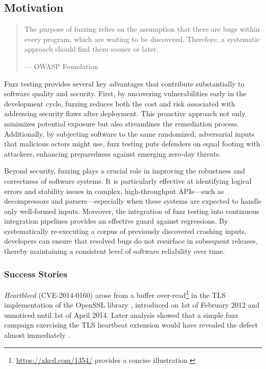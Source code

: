 \documentclass[
  a4paper,
]{scrreprt}
\theoremstyle{definition}
\theoremstyle{remark}
\begin{document}
\subsection{Motivation}\label{motivation}

\begin{quote}
The purpose of fuzzing relies on the assumption that there are bugs
within every program, which are waiting to be discovered. Therefore, a
systematic approach should find them sooner or later.

--- OWASP Foundation \autocite{owaspfoundation}
\end{quote}

Fuzz testing provides several key advantages that contribute
substantially to software quality and security. First, by uncovering
vulnerabilities early in the development cycle, fuzzing reduces both the
cost and risk associated with addressing security flaws after
deployment. This proactive approach not only minimizes potential
exposure but also streamlines the remediation process. Additionally, by
subjecting software to the same randomized, adversarial inputs that
malicious actors might use, fuzz testing puts defenders on equal footing
with attackers, enhancing preparedness against emerging zero-day
threats.

Beyond security, fuzzing plays a crucial role in improving the
robustness and correctness of software systems. It is particularly
effective at identifying logical errors and stability issues in complex,
high-throughput APIs---such as decompressors and parsers---especially
when these systems are expected to handle only well-formed inputs.
Moreover, the integration of fuzz testing into continuous integration
pipelines provides an effective guard against regressions. By
systematically re-executing a corpus of previously discovered crashing
inputs, developers can ensure that resolved bugs do not resurface in
subsequent releases, thereby maintaining a consistent level of software
reliability over time.

\subsubsection{Success Stories}\label{success-stories}

\emph{Heartbleed} (CVE-2014-0160) \autocite{heartbleed,heartbleed-cve}
arose from a buffer over-read\footnote{\url{https://xkcd.com/1354/}
  provides a concise illustration.} in the TLS implementation of the
OpenSSL library \autocite{theopensslproject2025}, introduced on 1st of
February 2012 and unnoticed until 1st of April 2014. Later analysis
showed that a simple fuzz campaign exercising the TLS heartbeat
extension would have revealed the defect almost immediately
\autocite{wheeler2014}.
\end{document}
